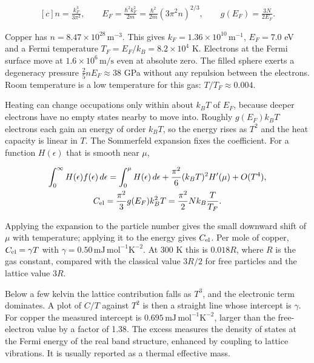 \documentclass[11pt,oneside]{book}
\newenvironment{centeredalign}{\[\begin{gathered}[c]}{\end{gathered}\]}
\begin{document}
\begin{centeredalign}
n=\frac{k_F^3}{3\pi^2},\qquad
E_F=\frac{\hbar^2k_F^2}{2m}=\frac{\hbar^2}{2m}(3\pi^2n)^{2/3},\qquad
g(E_F)=\frac{3N}{2E_F}.
\end{centeredalign}

Copper has \(n=8.47\times10^{28}\,\mathrm{m^{-3}}\). This gives \(k_F=1.36\times10^{10}\,\mathrm{m^{-1}}\), \(E_F=7.0\) eV and a Fermi temperature \(T_F=E_F/k_B=8.2\times10^4\) K. Electrons at the Fermi surface move at \(1.6\times10^6\,\mathrm{m/s}\) even at absolute zero. The filled sphere exerts a degeneracy pressure \(\frac25nE_F\approx38\) GPa without any repulsion between the electrons. Room temperature is a low temperature for this gas: \(T/T_F\approx0.004\).

Heating can change occupations only within about \(k_BT\) of \(E_F\), because deeper electrons have no empty states nearby to move into. Roughly \(g(E_F)k_BT\) electrons each gain an energy of order \(k_BT\), so the energy rises as \(T^2\) and the heat capacity is linear in \(T\). The Sommerfeld expansion fixes the coefficient. For a function \(H(\epsilon)\) that is smooth near \(\mu\),

\begin{centeredalign}
\int_0^\infty H(\epsilon)f(\epsilon)\,d\epsilon=\int_0^\mu H(\epsilon)\,d\epsilon
+\frac{\pi^2}{6}(k_BT)^2H'(\mu)+O(T^4),\\
C_{\rm el}=\frac{\pi^2}{3}g(E_F)k_B^2T=\frac{\pi^2}{2}Nk_B\frac{T}{T_F}.
\end{centeredalign}

Applying the expansion to the particle number gives the small downward shift of \(\mu\) with temperature; applying it to the energy gives \(C_{\rm el}\). Per mole of copper, \(C_{\rm el}=\gamma T\) with \(\gamma=0.50\,\mathrm{mJ\,mol^{-1}K^{-2}}\). At 300 K this is \(0.018R\), where \(R\) is the gas constant, compared with the classical value \(3R/2\) for free particles and the lattice value \(3R\).

Below a few kelvin the lattice contribution falls as \(T^3\), and the electronic term dominates. A plot of \(C/T\) against \(T^2\) is then a straight line whose intercept is \(\gamma\). For copper the measured intercept is \(0.695\,\mathrm{mJ\,mol^{-1}K^{-2}}\), larger than the free-electron value by a factor of 1.38. The excess measures the density of states at the Fermi energy of the real band structure, enhanced by coupling to lattice vibrations. It is usually reported as a thermal effective mass.
\end{document}
